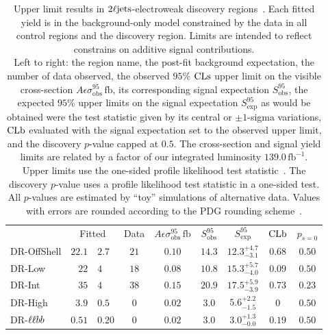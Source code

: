 \begin{table}[tp]
\centering
\begin{tabular*}{\textwidth}{lr@{$~\pm~$}lcccccc}
& \multicolumn{2}{c}{Fitted}
& Data
& $A\epsilon\sigma_{\mathrm{obs}}^{95}\,\mathrm{fb}$
& $S_{\mathrm{obs}}^{95}$
& $S_{\mathrm{exp}}^{95}$
& $\mathrm{CLb}$
& $p_{s\!=\!0}$
\\[1.5ex]
DR-OffShell & $22.1$ & $2.7$ & $21$ & $0.10$ & $14.3$ & $12.3^{+4.7}_{-3.1}$ & $0.68$ & $0.50$
\\[.5ex]
DR-Low & $22$ & $4$ & $18$ & $0.08$ & $10.8$ & $15.3^{+5.7}_{-4.0}$ & $0.09$ & $0.50$
\\[.5ex]
DR-Int & $35$ & $4$ & $38$ & $0.15$ & $20.9$ & $17.5^{+5.9}_{-3.9}$ & $0.73$ & $0.23$
\\[.5ex]
DR-High & $3.9$ & $0.5$ & $0$ & $0.02$ & $3.0$ & $5.6^{+2.2}_{-1.5}$ & $0$ & $0.50$
\\[.5ex]
DR-$\ell\ell bb$ & $0.51$ & $0.20$ & $0$ & $0.02$ & $3.0$ & $3.0^{+1.3}_{-0.0}$ & $0.19$ & $0.50$
\\[.5ex]
\end{tabular*}
\caption[
Upper limit results in $\twoljets$-electroweak discovery regions
]{%
Upper limit results in $\twoljets$-electroweak discovery
regions~\cite{atlas2022searches}.
Each fitted yield is in the background-only model constrained by the data in
all control regions and the discovery region.
Limits are intended to reflect constrains on additive signal contributions.
\\[0.5em]
Left to right:
the region name,
the post-fit background expectation,
the number of data observed,
the observed $95\%$ $\mathrm{CLs}$ upper limit on the visible cross-section
$A\epsilon\sigma_{\mathrm{obs}}^{95}\,\mathrm{fb}$,
its corresponding signal expectation $S_\mathrm{obs}^{95}$,
the expected $95\%$ upper limits on the signal expectation $S_\mathrm{exp}^{95}$
as would be obtained were the test statistic given by its central or
$\pm1$-sigma variations,
$\mathrm{CLb}$ evaluated with the signal expectation set to the observed upper limit,
and the discovery $p$-value capped at $0.5$.
The cross-section and signal yield limits are related by a factor of our
integrated luminosity $139.0\,\mathrm{fb}^{-1}$.
\\[0.5em]
Upper limits use the one-sided profile likelihood test
statistic~\cite{Cowan:2010js}.
The discovery $p$-value uses a profile likelihood test statistic in a one-sided
test.
All $p$-values are estimated by ``toy'' simulations of alternative data.
Values with errors are rounded according to the PDG rounding
scheme~\cite{pdg2022ynf}.%
}
\label{tab:2ljets_discovery}
\end{table}



